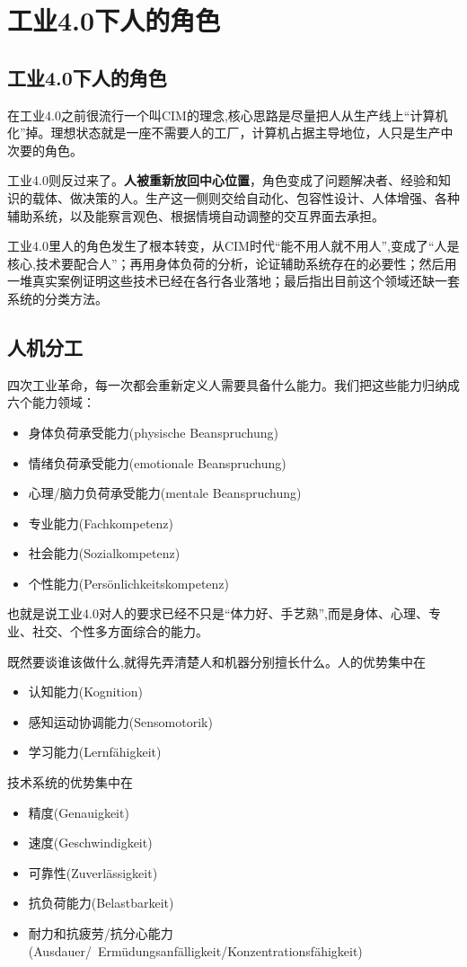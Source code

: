 \section{工业4.0下人的角色}

\subsection{工业4.0下人的角色}

在工业4.0之前很流行一个叫CIM的理念,核心思路是尽量把人从生产线上“计算机化”掉。理想状态就是一座不需要人的工厂，计算机占据主导地位，人只是生产中次要的角色。

工业4.0则反过来了。\textbf{人被重新放回中心位置}，角色变成了问题解决者、经验和知识的载体、做决策的人。生产这一侧则交给自动化、包容性设计、人体增强、各种辅助系统，以及能察言观色、根据情境自动调整的交互界面去承担。

工业4.0里人的角色发生了根本转变，从CIM时代“能不用人就不用人”,变成了“人是核心,技术要配合人”；再用身体负荷的分析，论证辅助系统存在的必要性；然后用一堆真实案例证明这些技术已经在各行各业落地；最后指出目前这个领域还缺一套系统的分类方法。

\subsection{人机分工}

四次工业革命，每一次都会重新定义人需要具备什么能力。我们把这些能力归纳成六个能力领域：
\begin{itemize}
    \item 身体负荷承受能力(physische Beanspruchung)
    \item 情绪负荷承受能力(emotionale Beanspruchung)
    \item 心理/脑力负荷承受能力(mentale Beanspruchung)
    \item 专业能力(Fachkompetenz)
    \item 社会能力(Sozialkompetenz)
    \item 个性能力(Persönlichkeitskompetenz)
\end{itemize}
也就是说工业4.0对人的要求已经不只是“体力好、手艺熟”,而是身体、心理、专业、社交、个性多方面综合的能力。

既然要谈谁该做什么,就得先弄清楚人和机器分别擅长什么。人的优势集中在
\begin{itemize}
    \item 认知能力(Kognition)
    \item 感知运动协调能力(Sensomotorik)
    \item 学习能力(Lernfähigkeit)
\end{itemize}
技术系统的优势集中在
\begin{itemize}
    \item 精度(Genauigkeit)
    \item 速度(Geschwindigkeit)
    \item 可靠性(Zuverlässigkeit)
    \item 抗负荷能力(Belastbarkeit)
    \item 耐力和抗疲劳/抗分心能力 (Ausdauer/~Ermüdungsanfälligkeit/Konzentrationsfähigkeit)
\end{itemize}

